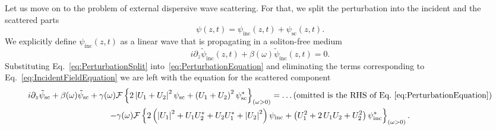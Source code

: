 \documentclass[aps, pra, twocolumn, superscriptaddress, final]{revtex4}
\newcommand{\abs}[1]{\left| #1 \right|}
\begin{document}
\begin{widetext}
Let us move on to the problem of external dispersive wave scattering. For that,
we split the perturbation into the incident and the scattered parts
\begin{equation}
  \label{eq:PerturbationSplit}
  \psi(z, t) = \psi_{\text{inc}}(z, t) + \psi_{\text{sc}}(z, t).
\end{equation}
We explicitly define $\psi_{\text{inc}}(z, t)$ as a linear wave that is propagating in a soliton-free medium
\begin{equation}
  \label{eq:IncidentFieldEquation}
  i \partial_{z} \tilde \psi_{\text{inc}}(z, t)
    + \beta(\omega) \tilde \psi_{\text{inc}}(z, t) = 0.
\end{equation}
Substituting Eq.~\eqref{eq:PerturbationSplit}
into~\eqref{eq:PerturbationEquation} and eliminating the terms corresponding to
Eq.~\eqref{eq:IncidentFieldEquation} we are left with the equation for the
scattered component
\begin{multline}
  \label{eq:ScatteredFieldEquation}
  i \partial_{z} \tilde \psi_{\text{sc}}
    + \beta(\omega) \tilde \psi_{\text{sc}}
    + \gamma(\omega) \mathcal{F}\left\{
      2 \abs{U_{1} + U_{2}}^{2} \psi_{\text{sc}} +
      \left( U_{1} + U_{2} \right)^{2} \psi_{\text{sc}}^{*}
    \right\}_{(\omega > 0)} = \text{\ldots (omitted is the RHS of Eq.~\eqref{eq:PerturbationEquation})} \\
    - \gamma(\omega) \mathcal{F}\left\{
      2 \left(
        \abs{U_{1}}^{2} + U_{1} U_{2}^{*} + U_{2} U_{1}^{*} + \abs{U_{2}}^{2}
      \right) \psi_{\text{inc}} +
      \left(
        U_{1}^{2} + 2 \, U_{1} U_{2} + U_{2}^{2}
      \right) \psi_{\text{inc}}^{*}
    \right\}_{(\omega > 0)}.
\end{multline}
\end{widetext}
\end{document}
